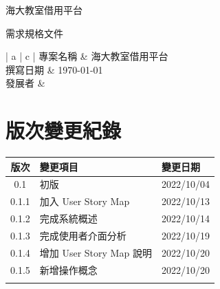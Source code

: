 \documentclass{article}
\begin{document}
\begin{titlepage}
	\centering

	{\huge 海大教室借用平台}

	\vfill

	{\huge 需求規格文件}

	\vfill

	\begin{Large}
		\begin{center}
			\begin{tabular}{| a | c |}
				\hline
				專案名稱 & 海大教室借用平台               \\ \hline
				撰寫日期 & \today                 \\ \hline
				發展者  &  \\ \hline
			\end{tabular}
		\end{center}
	\end{Large}
\end{titlepage}


\section*{版次變更紀錄}

\begin{tabularx}{\textwidth}{| c | X | X |}
	\rowcolor{LightGray}
	\hline
	版次    & 變更項目                 & 變更日期       \\ \hline
	0.1   & 初版                   & 2022/10/04 \\ \hline
	0.1.1 & 加入 User Story Map    & 2022/10/13 \\ \hline
	0.1.2 & 完成系統概述               & 2022/10/14 \\ \hline
	0.1.3 & 完成使用者介面分析            & 2022/10/19 \\ \hline
	0.1.4 & 增加 User Story Map 說明 & 2022/10/20 \\ \hline
	0.1.5 & 新增操作概念               & 2022/10/20 \\ \hline
	      &                      &            \\ \hline
\end{tabularx}

\newpage

\begin{center}
	\tableofcontents
\end{center}
\end{document}

